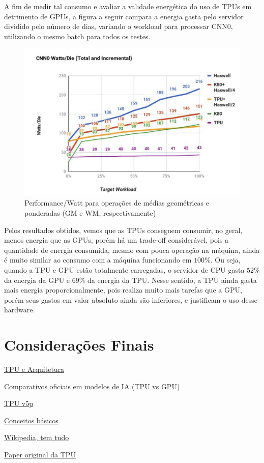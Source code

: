 \documentclass{report}
\begin{document}
A fim de medir tal consumo e avaliar a validade energética do uso de TPUs em detrimento de GPUs, a figura a seguir compara a energia gasta pelo servidor dividido pelo número de dias, variando o workload para processar CNN0, utilizando o mesmo batch para todos os testes.

\begin{figure}[h]
	\includegraphics[scale=0.5]{watts-die}
	\centering
	\caption{Performance/Watt para operações de médias geométricas e ponderadas (GM e WM, respectivamente)}
\end{figure}


Pelos resultados obtidos, vemos que as TPUs conseguem consumir, no geral, menos energia que as GPUs, porém há um trade-off considerável, pois a quantidade de energia consumida, mesmo com pouca operação na máquina, ainda é muito similar ao consumo com a máquina funcionando em $100\%$. Ou seja, quando a TPU e GPU estão totalmente carregadas, o servidor de CPU gasta $52\%$ da energia da GPU e $69\%$ da energia da TPU. Nesse sentido, a TPU ainda gasta mais energia proporcionalmente, pois realiza muito mais tarefas que a GPU, porém seus gastos em valor absoluto ainda são inferiores, e justificam o uso desse hardware.

\chapter{Considerações Finais}




\href{https://www.run.ai/guides/cloud-deep-learning/google-tpu}{TPU e Arquitetura}

\href{https://cloud.google.com/blog/products/compute/performance-per-dollar-of-gpus-and-tpus-for-ai-inference}{Comparativos oficiais em modelos de IA (TPU vs GPU)}

\href{https://canaltech.com.br/inteligencia-artificial/cloud-tpu-v5p-e-o-novo-e-mais-poderoso-acelerador-de-ia-do-google-272299/}{TPU v5p}

\href{https://cloud.google.com/tpu?hl=pt-BR}{Conceitos básicos}

\href{https://en.wikipedia.org/wiki/Tensor_Processing_Unit}{Wikipedia, tem tudo}

\href{https://arxiv.org/pdf/1704.04760}{Paper original da TPU}
\end{document}
